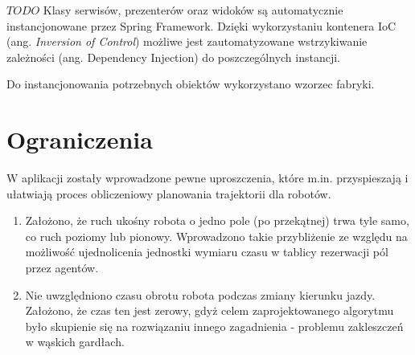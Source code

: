 $TODO$
Klasy serwisów, prezenterów oraz widoków są automatycznie instancjonowane przez Spring Framework. Dzięki wykorzystaniu kontenera IoC (ang. {\it Inversion of Control}) możliwe jest zautomatyzowane wstrzykiwanie zależności (ang. {Dependency Injection}) do poszczególnych instancji.

Do instancjonowania potrzebnych obiektów wykorzystano wzorzec fabryki.


\section{Ograniczenia}
W aplikacji zostały wprowadzone pewne uproszczenia, które m.in. przyspieszają i ułatwiają proces obliczeniowy planowania trajektorii dla robotów.
\begin{enumerate}
	\item Założono, że ruch ukośny robota o jedno pole (po przekątnej) trwa tyle samo, co ruch poziomy lub pionowy. Wprowadzono takie przybliżenie ze względu na możliwość ujednolicenia jednostki wymiaru czasu w tablicy rezerwacji pól przez agentów.
	\item Nie uwzględniono czasu obrotu robota podczas zmiany kierunku jazdy. Założono, że czas ten jest zerowy, gdyż celem zaprojektowanego algorytmu było skupienie się na rozwiązaniu innego zagadnienia - problemu zakleszczeń w wąskich gardłach.
\end{enumerate}

